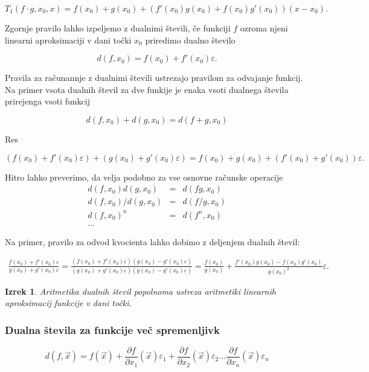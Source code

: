 \documentclass[12pt,slovene]{article}
\newtheorem{theorem}{Izrek}
\begin{document}
$$T_1(f\cdot g, x_0, x) = f(x_0) + g(x_0) + \left(f'(x_0)g(x_0) + f(x_0)g'(x_0)\right)(x - x_0).$$

Zgornje pravilo lahko izpeljemo z dualnimi števili, če funkciji $f$ ozroma njeni linearni aproksimaciji v dani točki $x_0$ priredimo dualno število

$$d(f, x_0) = f(x_0) + f'(x_0)\varepsilon.$$

Pravila za računannje z dualnimi števili ustrezajo pravilom za odvajanje funkcij. Na primer vsota dualnih števil za dve funkije je enaka vsoti dualnega števila prirejenga vsoti funkcij

$$d(f, x_0) + d(g, x_0) = d(f + g, x_0)$$ 

Res 

$$(f(x_0) + f'(x_0)\varepsilon) + (g(x_0) + g'(x_0)\varepsilon) = f(x_0) + g(x_0) + (f'(x_0) + g'(x_0))\varepsilon.$$

Hitro lahko preverimo, da velja podobno za vse osnovne računske operacije 
\begin{eqnarray*}
d(f, x_0)d(g, x_0) &=& d(fg, x_0)\\
d(f, x_0)/d(g, x_0) &=& d(f/g, x_0)\\
d(f, x_0)^n & =& d(f^n, x_0)\\
...
\end{eqnarray*} 

Na primer, pravilo za odvod kvocienta lahko dobimo z deljenjem dualnih števil:

\begin{multline*}
    \frac{f(x_0) + f'(x_0)\varepsilon}{g(x_0) + g'(x_0)\varepsilon} = \frac{(f(x_0) + f'(x_0)\varepsilon)(g(x_0) - g'(x_0)\varepsilon)}{(g(x_0) + g'(x_0)\varepsilon)(g(x_0) - g'(x_0)\varepsilon)} = \frac{f(x_0)}{g(x_0)} + \frac{f'(x_0)g(x_0) - f(x_0)g'(x_0)}{g(x_0)^2}\varepsilon.
\end{multline*}

\begin{theorem}
Aritmetika dualnih števil popolnoma ustreza aritmetiki linearnih aproksimacij funkcije v dani točki.
\end{theorem}


\subsubsection{Dualna števila za funkcije več spremenljivk}

$$d(f, \vec{x}) = f(\vec{x}) + \frac{\partial f}{\partial x_1}(\vec{x})\varepsilon_1 + \frac{\partial f}{\partial x_2}(\vec{x})\varepsilon_2\ldots \frac{\partial f}{\partial x_n}(\vec{x})\varepsilon_n  $$
\end{document}
